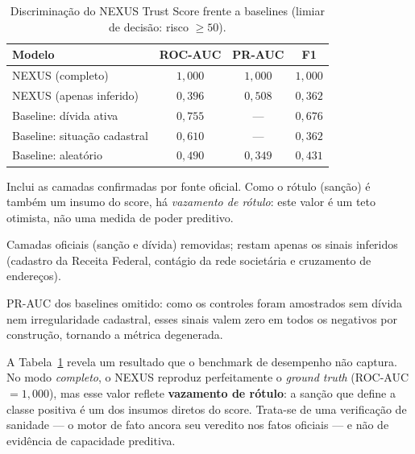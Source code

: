 \begin{table}[t]
  \centering
  \begin{threeparttable}
  \caption{Discriminação do NEXUS Trust Score frente a baselines
           (limiar de decisão: risco $\geq 50$).}
  \label{tab:avaliacao}
  \begin{tabular}{lccc}
    \toprule
    Modelo & ROC-AUC & PR-AUC & F1 \\
    \midrule
    NEXUS (completo)\tnote{a}     & $1{,}000$ & $1{,}000$ & $1{,}000$ \\
    NEXUS (apenas inferido)\tnote{b} & $0{,}396$ & $0{,}508$ & $0{,}362$ \\
    \midrule
    Baseline: dívida ativa        & $0{,}755$ & ---       & $0{,}676$ \\
    Baseline: situação cadastral  & $0{,}610$ & ---       & $0{,}362$ \\
    Baseline: aleatório           & $0{,}490$ & $0{,}349$ & $0{,}431$ \\
    \bottomrule
  \end{tabular}
  \begin{tablenotes}\footnotesize
    \item[a] Inclui as camadas confirmadas por fonte oficial. Como o rótulo
      (sanção) é também um insumo do score, há \emph{vazamento de rótulo}:
      este valor é um teto otimista, não uma medida de poder preditivo.
    \item[b] Camadas oficiais (sanção e dívida) removidas; restam apenas os
      sinais inferidos (cadastro da Receita Federal, contágio da rede
      societária e cruzamento de endereços).
    \item[] PR-AUC dos baselines omitido: como os controles foram amostrados
      sem dívida nem irregularidade cadastral, esses sinais valem zero em
      todos os negativos por construção, tornando a métrica degenerada.
  \end{tablenotes}
  \end{threeparttable}
\end{table}

A Tabela~\ref{tab:avaliacao} revela um resultado que o benchmark de
desempenho não captura. No modo \emph{completo}, o NEXUS reproduz
perfeitamente o \textit{ground truth} (ROC-AUC $=1{,}000$), mas esse valor
reflete \textbf{vazamento de rótulo}: a sanção que define a classe positiva
é um dos insumos diretos do score. Trata-se de uma verificação de
sanidade --- o motor de fato ancora seu veredito nos fatos oficiais --- e
não de evidência de capacidade preditiva.

